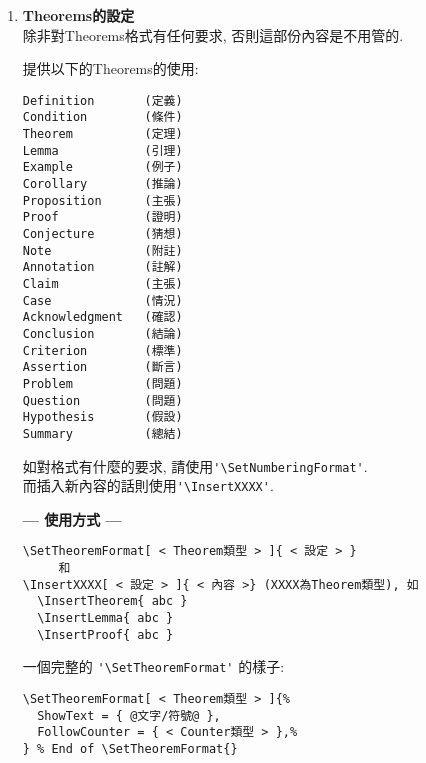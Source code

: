 \begin{enumerate}
{\begin{DescriptionFrame}
\begin{verbatim}
如想換'章'的由'第一章. ABCDEF'換成'第一章 ABCDEF'
  \SetNumberingFormat[Chapter]{%
    BeginText = {第}, EndText = {章},%
    CNumStyle = {ChiNum},%
    SepAtIndex = {},%
  }%
    \end{verbatim}
    \end{DescriptionFrame}
  } %

  \newpage
  \item
  {
    \textbf{Theorems的設定}\\
    除非對Theorems格式有任何要求, 否則這部份內容是不用管的.

    提供以下的Theorems的使用:
    \begin{DescriptionFrame}
    \begin{verbatim}
Definition       (定義)
Condition        (條件)
Theorem          (定理)
Lemma            (引理)
Example          (例子)
Corollary        (推論)
Proposition      (主張)
Proof            (證明)
Conjecture       (猜想)
Note             (附註)
Annotation       (註解)
Claim            (主張)
Case             (情況)
Acknowledgment   (確認)
Conclusion       (結論)
Criterion        (標準)
Assertion        (斷言)
Problem          (問題)
Question         (問題)
Hypothesis       (假設)
Summary          (總結)
    \end{verbatim}
    \end{DescriptionFrame}

    如對格式有什麼的要求, 請使用\verb|'\SetNumberingFormat'|.\\
    而插入新內容的話則使用\verb|'\InsertXXXX'|.

  \newpage
    \textbf{--- 使用方式 ---}
    \begin{DescriptionFrame}
    \begin{verbatim}
\SetTheoremFormat[ < Theorem類型 > ]{ < 設定 > }
     和
\InsertXXXX[ < 設定 > ]{ < 內容 >} (XXXX為Theorem類型), 如
  \InsertTheorem{ abc }
  \InsertLemma{ abc }
  \InsertProof{ abc }
    \end{verbatim}
    \end{DescriptionFrame}

    一個完整的 \verb|'\SetTheoremFormat'| 的樣子:
    \begin{DescriptionFrame}
    \begin{verbatim}
\SetTheoremFormat[ < Theorem類型 > ]{%
  ShowText = { @文字/符號@ },
  FollowCounter = { < Counter類型 > },%
} % End of \SetTheoremFormat{}
    \end{verbatim}
    \end{DescriptionFrame}

}
\end{enumerate}
